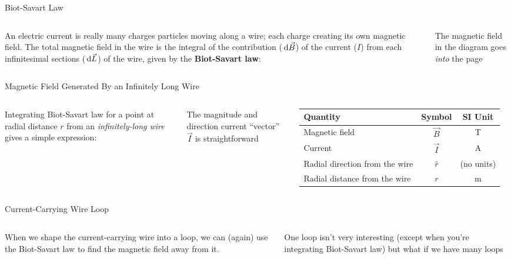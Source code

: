 \documentclass[12pt,aspectratio=169]{beamer}
\begin{document}
\begin{frame}{Biot-Savart Law}
  \begin{columns}
    
    An electric current is really many charges particles moving along a wire;
    each charge creating its own magnetic field.
    The total magnetic field in the wire is the integral of the contribution
    ($\dl{\vec B}$) of the current ($I$) from each infinitesimal sections
    ($\dl{\vec L}$) of the wire, given by the \textbf{Biot-Savart law}:
  

    The magnetic field in the diagram goes \emph{into} the page
  \end{columns}
\end{frame}



\begin{frame}{Magnetic Field Generated By an Infinitely Long Wire}
  \begin{columns}
    
    Integrating Biot-Savart law for a point at radial distance $r$ from an
    \emph{infinitely-long wire} gives a simple expression:


    The magnitude and direction current ``vector'' $\vec I$ is
    straightforward
    \begin{tabular}{l|c|c}
      \rowcolor{pink}
      \textbf{Quantity} & \textbf{Symbol} & \textbf{SI Unit} \\ \hline
      Magnetic field      & $\vec B$ & \si\tesla \\
      Current             & $\vec I$ & \si\ampere \\
      Radial direction from the wire & $\hat r$ & (no units)\\
      Radial distance from the wire  & $r$      & \si\metre
    \end{tabular}
  \end{columns}
\end{frame}


\begin{frame}{Current-Carrying Wire Loop}
  \begin{columns}

    When we shape the current-carrying wire into a loop, we can (again) use
    the Biot-Savart law to find the magnetic field away from it.

    \vspace{.2in}
    One loop isn't very interesting (except when you're integrating Biot-Savart
    law) but what if we have many loops
  \end{columns}
\end{frame}
\end{document}
